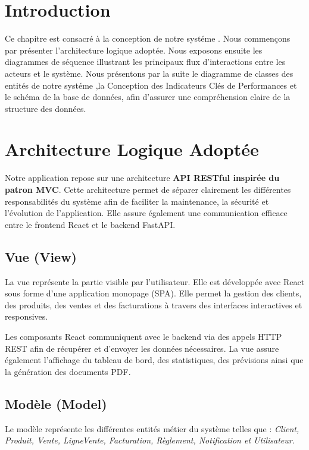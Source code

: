 ﻿

\section{Introduction}

Ce chapitre est consacré à la conception de notre systéme . 
Nous commençons par présenter l'architecture logique adoptée. Nous exposons 
ensuite les diagrammes de séquence illustrant les principaux flux d'interactions 
entre les acteurs et le système. Nous présentons par la suite le diagramme de 
classes des entités de notre systéme ,la Conception des Indicateurs Clés de Performances et le  schéma de la base de données, 
afin d'assurer une compréhension claire de la structure des données.

\section{Architecture Logique Adoptée}

Notre application repose sur une architecture \textbf{API RESTful inspirée du patron MVC}. 
Cette architecture permet de séparer clairement les différentes responsabilités du système 
afin de faciliter la maintenance, la sécurité et l’évolution de l’application. 
Elle assure également une communication efficace entre le frontend React et le backend FastAPI.

\subsection{Vue (View)}

La vue représente la partie visible par l’utilisateur. Elle est développée avec React sous 
forme d’une application monopage (SPA). Elle permet la gestion des clients, des produits, 
des ventes et des facturations à travers des interfaces interactives et responsives.

Les composants React communiquent avec le backend via des appels HTTP REST afin de récupérer 
et d’envoyer les données nécessaires. La vue assure également l’affichage du tableau de bord, 
des statistiques, des prévisions ainsi que la génération des documents PDF.

\subsection{Modèle (Model)}

Le modèle représente les différentes entités métier du système telles que :
\textit{Client, Produit, Vente, LigneVente, Facturation, Règlement, Notification et Utilisateur}.

